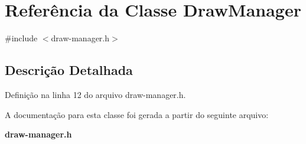 \section{Referência da Classe Draw\+Manager}
\label{class_draw_manager}


{\ttfamily \#include $<$draw-\/manager.\+h$>$}



\subsection{Descrição Detalhada}


Definição na linha 12 do arquivo draw-\/manager.\+h.



A documentação para esta classe foi gerada a partir do seguinte arquivo\+:\begin{DoxyCompactItemize}
\item 
{\bf draw-\/manager.\+h}\end{DoxyCompactItemize}
